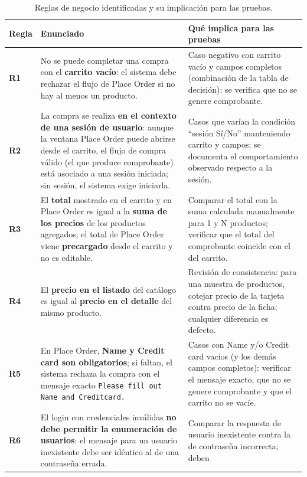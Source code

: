 \begingroup
\footnotesize
\setlength{\tabcolsep}{4pt}
\renewcommand{\arraystretch}{1.2}
\begin{table}[htb]\centering\footnotesize
\caption{Reglas de negocio identificadas y su implicación para las pruebas.}\label{tab:reglas}
\begin{tabularx}{\textwidth}{@{}L{0.9cm} Y Y@{}}
\toprule
\textbf{Regla} & \textbf{Enunciado} & \textbf{Qué implica para las pruebas} \\
\midrule
\textbf{R1} & No se puede completar una compra con el \textbf{carrito vacío}: el sistema
debe rechazar el flujo de Place Order si no hay al menos un producto. &
Caso negativo con carrito vacío y campos completos (combinación de la tabla de
decisión): se verifica que no se genere comprobante. \\
\textbf{R2} & La compra se realiza \textbf{en el contexto de una sesión de usuario}:
aunque la ventana Place Order puede abrirse desde el carrito, el flujo de compra válido
(el que produce comprobante) está asociado a una sesión iniciada; sin sesión, el
sistema exige iniciarla. &
Casos que varían la condición ``sesión Sí/No'' manteniendo carrito y campos; se
documenta el comportamiento observado respecto a la sesión. \\
\textbf{R3} & El \textbf{total} mostrado en el carrito y en Place Order es igual a la
\textbf{suma de los precios} de los productos agregados; el total de Place Order viene
\textbf{precargado} desde el carrito y no es editable. &
Comparar el total con la suma calculada manualmente para 1 y N productos; verificar que
el total del comprobante coincide con el del carrito. \\
\textbf{R4} & El \textbf{precio en el listado} del catálogo es igual al \textbf{precio
en el detalle} del mismo producto. &
Revisión de consistencia: para una muestra de productos, cotejar precio de la tarjeta
contra precio de la ficha; cualquier diferencia es defecto. \\
\textbf{R5} & En Place Order, \textbf{Name y Credit card son obligatorios}; si faltan,
el sistema rechaza la compra con el mensaje exacto \texttt{Please fill out Name and
Creditcard.} &
Casos con Name y/o Credit card vacíos (y los demás campos completos): verificar el
mensaje exacto, que no se genere comprobante y que el carrito no se vacíe. \\
\textbf{R6} & El login con credenciales inválidas \textbf{no debe permitir la
enumeración de usuarios}: el mensaje para un usuario inexistente debe ser idéntico al
de una contraseña errada. &
Comparar la respuesta de usuario inexistente contra la de contraseña incorrecta; deben

\end{tabularx}
\end{table}
